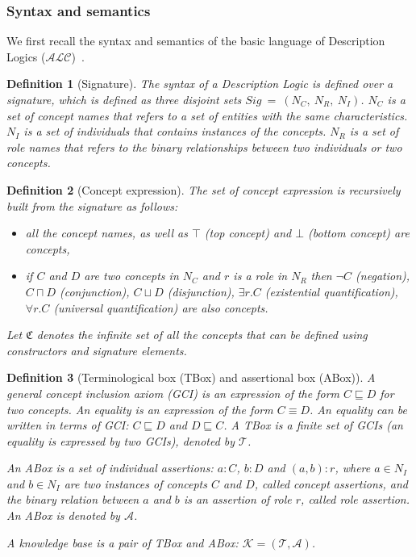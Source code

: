 \documentclass{article}
\newtheorem{mydef}{Definition}
\begin{document}
\subsubsection{Syntax and semantics}
\label{subsec:synt}
We first recall the syntax and semantics of the basic language of Description Logics ($\mathcal{ALC}$)~\cite{baader2003description}.
\begin{mydef}[Signature]
 The syntax of a Description Logic is defined over a signature, which is defined as three disjoint sets $Sig~=~(N_C,~N_R,~N_I)$. $N_C$ is a set of concept names that refers to a set of entities
 with the same characteristics. $N_I$ is a set of individuals that contains instances of the concepts.  $N_R$ is a set of role names that refers to the binary relationships between 
 two individuals or two concepts.
\end{mydef}


\begin{mydef}[Concept expression]
 The set of concept expression is recursively built from the signature as follows:
 \begin{itemize}
  \item all the concept names, as well as $\top$ (top concept) and $\bot$ (bottom concept) are concepts,
  \item if $C$ and $D$ are two concepts in $N_C$ and $r$ is a role in $N_R$
  then $\neg C$ (negation), $ C\sqcap D$ (conjunction), $ C\sqcup D$ (disjunction), $ \exists r.C$ (existential quantification), $\forall r.C$ (universal quantification) are also concepts.
 \end{itemize}
 Let $\mathfrak{C}$ denotes the infinite set of all the concepts that can be defined using constructors and signature elements.
\end{mydef}


\begin{mydef}[Terminological box (TBox) and assertional box (ABox)]
A general concept inclusion axiom (GCI) is an expression of the form $C\sqsubseteq D$ for two  concepts. 
An equality is an expression of the form $C\equiv D$. An equality can be written in terms of GCI: $C\sqsubseteq D$ and $D\sqsubseteq C$.
A TBox is a finite set of GCIs (an equality is expressed by two GCIs), denoted by $\mathcal{T}$.

An ABox is a set of individual assertions: $a:C$, $b:D$ and $(a,b):r$, where $a\in N_I$ and $b\in N_I$ are two instances of concepts $C$ and $D$, called concept assertions, and
the binary relation between $a$ and $b$ is an assertion of role $r$, called role assertion. An ABox is denoted by $\mathcal{A}$.

A knowledge base is a pair of TBox and ABox: $\mathcal{K}=(\mathcal{T},\mathcal{A})$.
\end{mydef}
\end{document}
